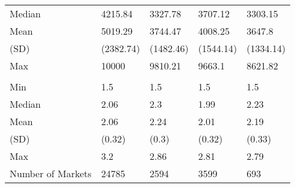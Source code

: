 \begin{tabular}[t]{lllll}
\hspace{1em}Median & 4215.84 & 3327.78 & 3707.12 & 3303.15\\
\hspace{1em}Mean & 5019.29 & 3744.47 & 4008.25 & 3647.8\\
\hspace{1em}(SD) & (2382.74) & (1482.46) & (1544.14) & (1334.14)\\
\hspace{1em}Max & 10000 & 9810.21 & 9663.1 & 8621.82\\
\addlinespace[0.3em]
\multicolumn{5}{l}{\textbf{Market Minimum Distance}}\\
\hspace{1em}Min & 1.5 & 1.5 & 1.5 & 1.5\\
\hspace{1em}Median & 2.06 & 2.3 & 1.99 & 2.23\\
\hspace{1em}Mean & 2.06 & 2.24 & 2.01 & 2.19\\
\hspace{1em}(SD) & (0.32) & (0.3) & (0.32) & (0.33)\\
\hspace{1em}Max & 3.2 & 2.86 & 2.81 & 2.79\\
\midrule
Number of Markets & 24785 & 2594 & 3599 & 693\\
\bottomrule
\end{tabular}
